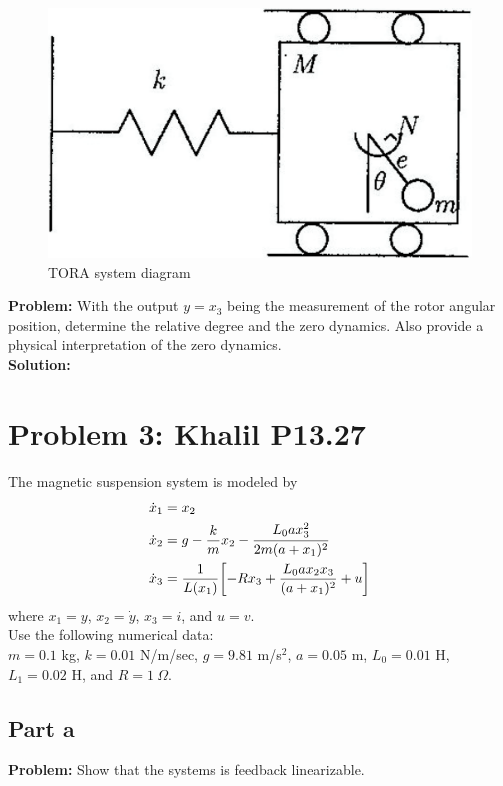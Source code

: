 \documentclass[letter]{article}
\numberwithin{equation}{section}
\begin{document}
\begin{figure}[h]
	\centering
	\includegraphics[width=0.7\linewidth]{fig/pblm2_fig}
	\caption{TORA system diagram}
	\label{fig:pblm2fig}
\end{figure}

\noindent
\textbf{Problem:}
With the output $y = x_3$ being the measurement of the rotor angular position, determine the relative degree and the zero dynamics. Also provide a physical interpretation of the zero dynamics.\\

\noindent
\textbf{Solution:}






\newpage
\section{Problem 3: Khalil P13.27}
The magnetic suspension system is modeled by
\begin{equation}
	\begin{aligned}
		\dot{x}_1 &= x_2\\
		\dot{x}_2 &= g - \frac{k}{m} x_2 - \cfrac{L_0 a x_3^2}{2m (a + x_1)^2}\\
		\dot{x}_3 &= \frac{1}{L(x_1)} \qty[-R x_3 + \frac{L_0 a x_2 x_3}{(a + x_1)^2} + u]
	\end{aligned}
\end{equation}
where $x_1 = y$, $x_2 = \dot{y}$, $x_3 = i$, and $u = v$.\\
Use the following numerical data:\\
$m = 0.1$ kg, $k = 0.01$ N/m/sec, $g = 9.81$ m/s$^2$, $a = 0.05$ m, $L_0 = 0.01$ H, $L_1 = 0.02$ H, and $R = 1 \ \Omega$.

\subsection{Part a}
\textbf{Problem:}
Show that the systems is feedback linearizable.\\
\end{document}
